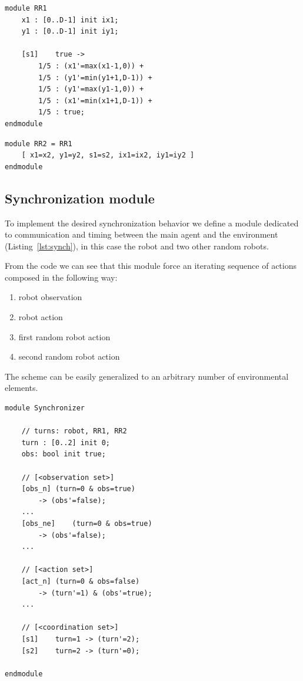 \documentclass{article}
\begin{document}
\begin{lstlisting}[caption=Random robot module, label=lst:random_robot, captionpos=b, frame=single]
module RR1
	x1 : [0..D-1] init ix1;
	y1 : [0..D-1] init iy1;

	[s1]	true -> 
		1/5 : (x1'=max(x1-1,0)) +
		1/5 : (y1'=min(y1+1,D-1)) +
		1/5 : (y1'=max(y1-1,0)) +
		1/5 : (x1'=min(x1+1,D-1)) +
		1/5 : true;
endmodule
\end{lstlisting}

\begin{lstlisting}[caption=Random robot replica, label=lst:replica, captionpos=b, frame=single]
module RR2 = RR1 
	[ x1=x2, y1=y2, s1=s2, ix1=ix2, iy1=iy2 ] 
endmodule
\end{lstlisting}

\subsection*{Synchronization module} %
\label{sub:synchronization_module}

To implement the desired synchronization behavior we define a module dedicated to communication and timing between the main agent and the environment (Listing~\ref{lst:synch}), in this case the robot and two other random robots.

From the code we can see that this module force an iterating sequence of actions composed in the following way:
\begin{enumerate}
	\item robot observation
	\item robot action
	\item first random robot action
	\item second random robot action
\end{enumerate}
The scheme can be easily generalized to an arbitrary number of environmental elements.

\begin{lstlisting}[caption=Synchronization module, label=lst:synch, captionpos=b, frame=single]
module Synchronizer

	// turns: robot, RR1, RR2
	turn : [0..2] init 0; 
	obs: bool init true;
	
	// [<observation set>]
	[obs_n]	(turn=0 & obs=true) 
		-> (obs'=false);
	...
	[obs_ne]	(turn=0 & obs=true) 
		-> (obs'=false);
	...

	// [<action set>]
	[act_n]	(turn=0 & obs=false) 
		-> (turn'=1) & (obs'=true);
	...

	// [<coordination set>]
	[s1]	turn=1 -> (turn'=2);
	[s2]	turn=2 -> (turn'=0);

endmodule	
\end{lstlisting}
\end{document}
